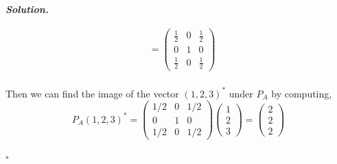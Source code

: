 \documentclass[12pt]{report}
\newenvironment{solution}[1][\it{Solution}]{\textbf{#1. } }{$\square$}
\begin{document}
\begin{solution}
\begin{enumerate}
\begin{align*}
            &= \begin{pmatrix}\frac{1}{2}&0&\frac{1}{2}\\ 0&1&0\\ \frac{1}{2}&0&\frac{1}{2}\end{pmatrix}
        \end{align*}\\
        Then we can find the image of the vector $(1,2,3)^*$ under $P_A$ by computing,
        \[
            P_A(1,2,3)^* = \begin{pmatrix}
                1/2&0&1/2\\
                0&1&0\\
                1/2&0&1/2
            \end{pmatrix} \begin{pmatrix}
                1\\2\\3
            \end{pmatrix} = \begin{pmatrix}
                2\\2\\2
            \end{pmatrix}
        \] 


\end{enumerate}
\end{solution}
\end{document}
